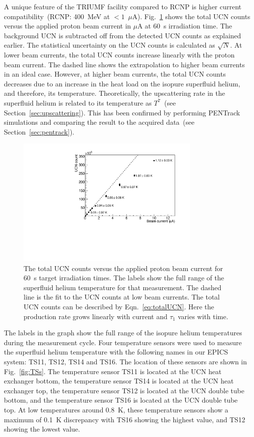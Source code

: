 A unique feature of the TRIUMF facility compared to RCNP is higher
current compatibility~(RCNP: 400~MeV at $<1$~$\mu$A).
Fig.~\ref{fig:counts_vs_beam} shows the total UCN counts versus the
applied proton beam current in $\mu$A at 60~s irradiation time. The
background UCN is subtracted off from the detected UCN counts as
explained earlier. The statistical uncertainty on the UCN counts is
calculated as $\sqrt{N}$. At lower beam currents, the total UCN counts
increase linearly with the proton beam current. The dashed line shows
the extrapolation to higher beam currents in an ideal case. However,
at higher beam currents, the total UCN counts decreases due to an
increase in the heat load on the isopure superfluid helium, and
therefore, its temperature. Theoretically, the upscattering rate in
the superfluid helium is related to its temperature as $T^7$~(see
Section~\ref{sec:upscattering}). This has been confirmed by performing
PENTrack simulations and comparing the result to the acquired
data~(see Section~\ref{sec:pentrack}).



\begin{figure}[h!]
  \centering
  \includegraphics[width=0.8\textwidth]{UCNCounts_vs_Beam.pdf}
  \caption[UCN counts versus proton beam current]{The total UCN counts
    versus the applied proton beam current for 60~s target irradiation
    times. The labels show the full range of the superfluid helium
    temperature for that measurement. The dashed line is the fit to
    the UCN counts at low beam currents. The total UCN counts can be
    described by Eqn.~\ref{eq:totalUCN}. Here the production rate
    grows linearly with current and $\tau_1$ varies with time.}
  \label{fig:counts_vs_beam}
\end{figure}


The labels in the graph show the full range of the isopure helium
temperatures during the measurement cycle. Four temperature sensors
were used to measure the superfluid helium temperature with the
following names in our EPICS system: TS11, TS12, TS14 and TS16. The
location of these sensors are shown in Fig.~\ref{fig:TSs}. The
temperature sensor TS11 is located at the UCN heat exchanger bottom,
the temperature sensor TS14 is located at the UCN heat exchanger top,
the temperature sensor TS12 is located at the UCN double tube bottom,
and the temperature sensor TS16 is located at the UCN double tube
top. At low temperatures around 0.8~K, these temperature sensors show
a maximum of 0.1~K discrepancy with TS16 showing the highest value,
and TS12 showing the lowest value.


